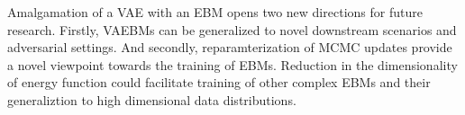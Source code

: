 \documentclass[12pt,letterpaper]{article}
\begin{document}
Amalgamation of a VAE with an EBM opens two new directions for future research. Firstly, VAEBMs can be generalized to novel downstream scenarios and adversarial settings. And secondly, reparamterization of MCMC updates provide a novel viewpoint towards the training of EBMs. Reduction in the dimensionality of energy function could facilitate training of other complex EBMs and their generaliztion to high dimensional data distributions.
\end{document}
